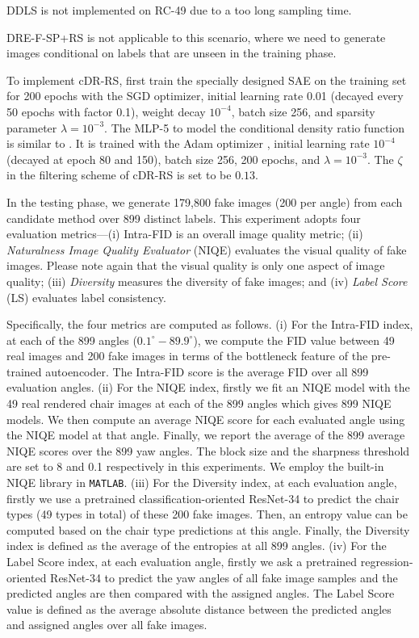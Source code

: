 \documentclass[final,12pt, 3p,times]{elsarticle}
\begin{document}
DDLS is not implemented on RC-49 due to a too long sampling time.

DRE-F-SP+RS is not applicable to this scenario, where we need to generate images conditional on labels that are unseen in the training phase.

To implement cDR-RS, first train the specially designed SAE on the training set for 200 epochs with the SGD optimizer, initial learning rate 0.01 (decayed every 50 epochs with factor 0.1), weight decay $10^{-4}$, batch size 256, and sparsity parameter $\lambda=10^{-3}$. The MLP-5 to model the conditional density ratio function is similar to . It is trained with the Adam optimizer \cite{kingma2014adam}, initial learning rate $10^{-4}$ (decayed at epoch 80 and 150), batch size 256, 200 epochs, and $\lambda=10^{-3}$. The $\zeta$ in the filtering scheme of cDR-RS is set to be $0.13$. 

In the testing phase, we generate 179,800 fake images (200 per angle) from each candidate method over 899 distinct labels. This experiment adopts four evaluation metrics---(i) Intra-FID \cite{miyato2018cgans} is an overall image quality metric; (ii) \textit{Naturalness Image Quality Evaluator} (NIQE) \cite{mittal2012making} evaluates the visual quality of fake images. Please note again that the visual quality is only one aspect of image quality; (iii) \textit{Diversity} measures the diversity of fake images; and (iv) \textit{Label Score} (LS) evaluates label consistency. 

Specifically, the four metrics are computed as follows. (i) For the Intra-FID index, at each of the 899 angles ($0.1^{\circ}-89.9^{\circ}$), we compute the FID \cite{heusel2017gans} value between 49 real images and 200 fake images in terms of the bottleneck feature of the pre-trained autoencoder. The Intra-FID score is the average FID over all 899 evaluation angles. (ii) For the NIQE index, firstly we fit an NIQE model with the 49 real rendered chair images at each of the 899 angles which gives 899 NIQE models. We then compute an average NIQE score for each evaluated angle using the NIQE model at that angle. Finally, we report the average of the 899 average NIQE scores over the 899 yaw angles. The block size and the sharpness threshold are set to 8 and 0.1 respectively in this experiments. We employ the built-in NIQE library in \texttt{MATLAB}. (iii) For the Diversity index, at each evaluation angle, firstly we use a pretrained classification-oriented ResNet-34 to predict the chair types (49 types in total) of these 200 fake images. Then, an entropy value can be computed based on the chair type predictions at this angle. Finally, the Diversity index is defined as the average of the entropies at all 899 angles. (iv) For the Label Score index, at each evaluation angle, firstly we ask a pretrained regression-oriented ResNet-34 to predict the yaw angles of all fake image samples and the predicted angles are then compared with the assigned angles. The Label Score value is defined as the average absolute distance between the predicted angles and assigned angles over all fake images.
\end{document}
